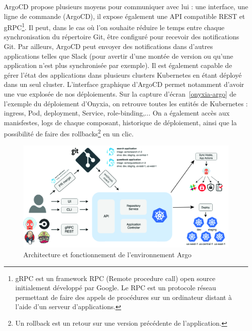 \documentclass[11pt,fleqn]{book} %
\begin{document}
ArgoCD propose plusieurs moyens pour communiquer avec lui : une interface, une ligne de commande (ArgoCD), il expose également une API compatible REST et gRPC\footnote{gRPC est un framework RPC (Remote procedure call) open source initialement développé par Google. Le RPC est un protocole réseau permettant de faire des appels de procédures sur un ordinateur distant à l'aide d'un serveur d'applications.}. Il peut, dans le cas où l'on souhaite réduire le temps entre chaque synchronisation du répertoire Git, être configuré pour recevoir des notifications Git. Par ailleurs, ArgoCD peut envoyer des notifications dans d'autres applications telles que Slack (pour avertir d'une montée de version ou qu'une application n'est plus synchronisée par exemple). Il est également capable de gérer l'état des applications dans plusieurs clusters Kubernetes en étant déployé dans un seul cluster.
L'interface graphique d'ArgoCD permet notamment d'avoir une vue explosée de nos déploiements. Sur la capture d'écran~\ref{onyxia-argo} de l'exemple du déploiement d'Onyxia, on retrouve toutes les entités de Kubernetes : ingress, Pod, deployment, Service, role-binding,... On a également accès aux manisfestes, logs de chaque composant, historique de déploiement, ainsi que la possibilité de faire des rollbacks\footnote{Un rollback est un retour sur une version précédente de l'application.} en un clic.

\begin{figure}[H]
\renewcommand{\figurename}{Schéma}
\includegraphics[scale=0.1]{Pictures/CI-CD/argocd_architecture.png}
\captionsetup{margin=1.5cm,format=hang,justification=justified}
\caption[]{Architecture et fonctionnement de l'environnement Argo \newline}
\end{figure}
\end{document}
